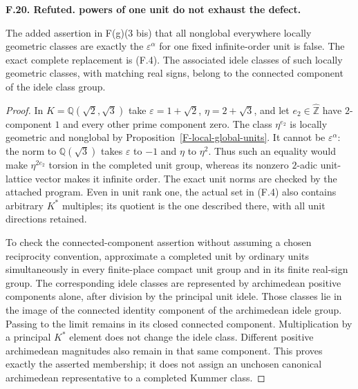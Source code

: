 \documentclass[11pt,oneside]{article}
\makeatletter
\newcounter{statementanchor}
\newenvironment{statement}[3]{%
 \refstepcounter{statementanchor}\def\@currentlabel{#1}%
 \par\addvspace{9pt}\noindent
 \textbf{#1. #2. #3.}\par\nobreak\noindent\ignorespaces
}{\par\addvspace{5pt}}
\makeatother
\begin{document}
\begin{statement}{F.20}{Refuted}{powers of one unit do not exhaust the defect}
\label{st:F.20}
\label{F-one-unit-false}
The added assertion in F(g)(3 bis) that all nonglobal everywhere
locally geometric classes are exactly the $\varepsilon^\alpha$
for one fixed infinite-order unit is false. The exact complete
replacement is (F.4). The associated idele classes of such locally
geometric classes, with matching real signs, belong to the
connected component of the idele class group.
\end{statement}
\begin{proof}
In $K=\mathbb Q(\sqrt2,\sqrt3)$ take
$\varepsilon=1+\sqrt2$, $\eta=2+\sqrt3$, and let
$e_2\in\widehat{\mathbb Z}$ have $2$-component $1$ and every
other prime component zero. The class $\eta^{e_2}$ is locally
geometric and nonglobal by Proposition~\ref{F-local-global-units}.
It cannot be $\varepsilon^\alpha$: the norm to
$\mathbb Q(\sqrt3)$ takes $\varepsilon$ to $-1$ and $\eta$
to $\eta^2$. Thus such an equality would make
$\eta^{2e_2}$ torsion in the completed unit group, whereas its
nonzero $2$-adic unit-lattice vector makes it infinite order.
The exact unit norms are checked by the attached program.
Even in unit rank one, the actual set in (F.4) also contains
arbitrary $K^*$ multiples; its quotient is the one described
there, with all unit directions retained.

To check the connected-component assertion without assuming a
chosen reciprocity convention, approximate a completed unit by
ordinary units simultaneously in every finite-place compact unit
group and in its finite real-sign group. The corresponding idele
classes are represented by archimedean positive components alone,
after division by the principal unit idele. Those classes lie in
the image of the connected identity component of the archimedean
idele group. Passing to the limit remains in its closed connected
component. Multiplication by a principal $K^*$ element does not
change the idele class. Different positive archimedean magnitudes
also remain in that same component. This proves exactly the
asserted membership; it does not assign an unchosen canonical
archimedean representative to a completed Kummer class.
\end{proof}
\end{document}
